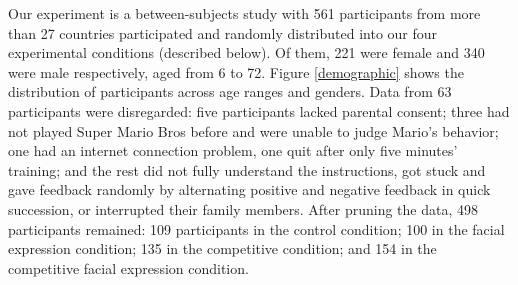 Our experiment is a between-subjects study with 561 participants from more than 27 countries participated and %
randomly distributed into our four experimental conditions (described below). %
Of them, 221 were female and 340 were male respectively, aged from 6 to 72. Figure \ref{demographic} %
shows the distribution of participants across age ranges and genders. %
Data from 63 participants were disregarded: five participants lacked parental consent; three had not played Super Mario Bros before and were unable to judge Mario's behavior; one had an internet connection problem, one quit after only five minutes' training; and the rest did not fully understand the instructions, got stuck and gave feedback randomly by alternating positive and negative feedback in quick succession, or interrupted their family members. %
After pruning the data, 498 participants remained: 109 participants in the control condition; 100 in the facial expression condition; 135 in the competitive condition; and 154 in the competitive facial expression condition.

